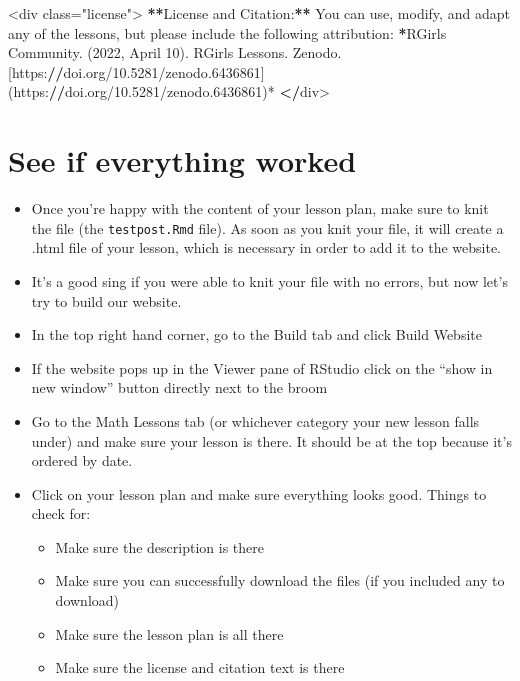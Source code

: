 \documentclass[
]{article}
\newenvironment{Shaded}{\begin{snugshade}}{\end{snugshade}}
\newcommand{\DecValTok}[1]{\textcolor[rgb]{0.00,0.00,0.81}{#1}}
\newcommand{\ErrorTok}[1]{\textcolor[rgb]{0.64,0.00,0.00}{\textbf{#1}}}
\newcommand{\FloatTok}[1]{\textcolor[rgb]{0.00,0.00,0.81}{#1}}
\newcommand{\FunctionTok}[1]{\textcolor[rgb]{0.00,0.00,0.00}{#1}}
\newcommand{\NormalTok}[1]{#1}
\newcommand{\OtherTok}[1]{\textcolor[rgb]{0.56,0.35,0.01}{#1}}
\newcommand{\SpecialCharTok}[1]{\textcolor[rgb]{0.00,0.00,0.00}{#1}}
\newcommand{\StringTok}[1]{\textcolor[rgb]{0.31,0.60,0.02}{#1}}
\providecommand{\tightlist}{%
  \setlength{\itemsep}{0pt}\setlength{\parskip}{0pt}}
\begin{document}
\begin{Shaded}
\begin{Highlighting}[]
\SpecialCharTok{\textless{}}\NormalTok{div class}\OtherTok{=}\StringTok{"license"}\SpecialCharTok{\textgreater{}}
\ErrorTok{**}\NormalTok{License and Citation}\SpecialCharTok{:}\ErrorTok{**}\NormalTok{ You can use, modify, and adapt any of the lessons, but please include the following attribution}\SpecialCharTok{:} \ErrorTok{*}\NormalTok{RGirls }\FunctionTok{Community.}\NormalTok{ (}\DecValTok{2022}\NormalTok{, April }\DecValTok{10}\NormalTok{). RGirls Lessons. Zenodo. [https}\SpecialCharTok{:}\ErrorTok{//}\NormalTok{doi.org}\SpecialCharTok{/}\FloatTok{10.5281}\SpecialCharTok{/}\NormalTok{zenodo}\FloatTok{.6436861}\NormalTok{](https}\SpecialCharTok{:}\ErrorTok{//}\NormalTok{doi.org}\SpecialCharTok{/}\FloatTok{10.5281}\SpecialCharTok{/}\NormalTok{zenodo}\FloatTok{.6436861}\NormalTok{)}\SpecialCharTok{*} 
\ErrorTok{\textless{}/}\NormalTok{div}\SpecialCharTok{\textgreater{}}
\end{Highlighting}
\end{Shaded}

\hypertarget{see-if-everything-worked}{%
\section{See if everything worked}\label{see-if-everything-worked}}

\begin{itemize}
\item
  Once you're happy with the content of your lesson plan, make sure to
  knit the file (the \texttt{testpost.Rmd} file). As soon as you knit
  your file, it will create a .html file of your lesson, which is
  necessary in order to add it to the website.
\item
  It's a good sing if you were able to knit your file with no errors,
  but now let's try to build our website.
\item
  In the top right hand corner, go to the Build tab and click Build
  Website
\item
  If the website pops up in the Viewer pane of RStudio click on the
  ``show in new window'' button directly next to the broom
\item
  Go to the Math Lessons tab (or whichever category your new lesson
  falls under) and make sure your lesson is there. It should be at the
  top because it's ordered by date.
\item
  Click on your lesson plan and make sure everything looks good. Things
  to check for:

  \begin{itemize}
  \tightlist
  \item
    Make sure the description is there
  \item
    Make sure you can successfully download the files (if you included
    any to download)
  \item
    Make sure the lesson plan is all there
  \item
    Make sure the license and citation text is there
  \end{itemize}
\end{itemize}
\end{document}
